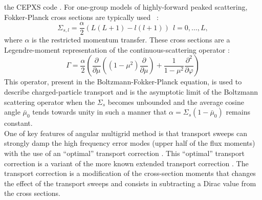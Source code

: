 \documentclass[preprint,10pt]{elsarticle}
\renewcommand{\(}{\left(}
\renewcommand{\)}{\right)}
\renewcommand{\[}{\left[}
\renewcommand{\]}{\right]}
\begin{document}
the CEPXS code \cite{cepxs}. For one-group models of highly-forward peaked scattering, Fokker-Planck cross sections 
are typically used \hbox{\cite{multigrid_1d,multigrid_2d,morel_81,morel_96} :}
%
\begin{equation}
\Sigma_{s,l}=\frac{\alpha}{2} (L(L+1)-l(l+1))\ \ l=0,\hdots,L ,
\end{equation}
%
where $\alpha$ is the restricted momentum transfer.
These cross sections are a Legendre-moment representation of the
continuous-scattering operator \cite{morel_96} :
%
\begin{equation}
\Gamma = \frac{\alpha}{2} \(\frac{\partial }{\partial \mu}\((1-\mu^2)\frac{\partial
}{\partial \mu}\)+\frac{1}{1-\mu^2}\frac{\partial^2}{\partial \varphi}\)
\end{equation}
%
This operator, present in the Boltzmann-Fokker-Planck equation, is used to describe
charged-particle transport \cite{morel_81,morel_96} and is the asymptotic 
limit of the  Boltzmann scattering operator when the $\Sigma_s$ becomes 
unbounded and the average cosine angle $\bar{\mu}_0$ tends towards unity in 
such a manner that $\alpha = \Sigma_s(1-\bar{\mu}_0)$ remains constant.\\

One of key features of angular multigrid method is that transport sweeps
can strongly damp the high frequency error modes (upper half of the flux moments) with the
use of an ``optimal'' transport correction \cite{multigrid_1d}. 
This ``optimal'' transport correction is a variant of the
more known extended transport correction \cite{lathrop,morel_79}. The transport
correction is a modification of the cross-section moments that changes the effect
of the transport sweeps and consists in subtracting a Dirac value from the cross
sections. 
\end{document}
